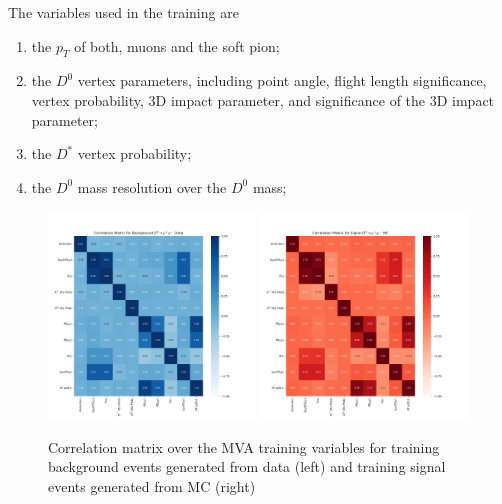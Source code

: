 The variables used in the training are
\begin{enumerate}
    \item the $p_T$ of both, muons and the soft pion;
    \item the $D^0$ vertex parameters, including point angle, flight length significance, vertex probability, 3D impact parameter, and significance of the 3D impact parameter;
    \item the $D^*$ vertex probability;
    \item the $D^0$ mass resolution over the $D^0$ mass;
\end{enumerate}

\begin{figure}[htp]
    \begin{center}
      \includegraphics[width=0.49\textwidth]{figures/chapter4/mva/Correlation_data.png}
      \includegraphics[width=0.49\textwidth]{figures/chapter4/mva/Correlation_dmm.png}\\
    \end{center}
    \caption{
      Correlation matrix over the MVA training variables for training background events generated from data (left) and training signal events generated from MC (right)
    }
    \label{fig:mva_correlation_matrix_for_training_variables}
\end{figure}

